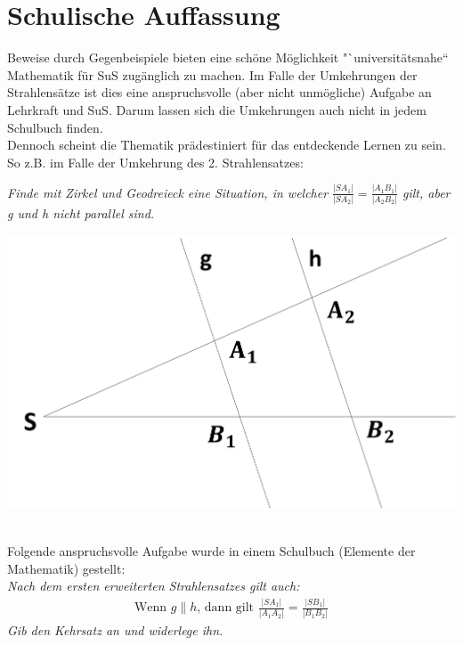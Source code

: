 \documentclass[a4paper,headlines=4, footlines=1]{scrartcl}
\begin{document}
\section{Schulische Auffassung}
Beweise durch Gegenbeispiele bieten eine schöne Möglichkeit "`universitätsnahe`` Mathematik für SuS zugänglich zu machen. Im Falle der Umkehrungen der Strahlensätze ist dies eine anspruchsvolle (aber nicht unmögliche) Aufgabe an Lehrkraft und SuS. Darum lassen sich die Umkehrungen auch nicht in jedem Schulbuch finden. \\
Dennoch scheint die Thematik prädestiniert für das entdeckende Lernen zu sein. So z.B. im Falle der Umkehrung des 2. Strahlensatzes:\\
\begin{minipage}{0.5\textwidth}
	\textit{Finde mit Zirkel und Geodreieck eine Situation, in welcher $\frac{|SA_1|}{|SA_2|}=\frac{|A_1B_1|}{|A_2B_2|}$ gilt, aber g und h nicht parallel sind.}	
\end{minipage}
\begin{minipage}{0.5\textwidth}
	\begin{flushright}
		\includegraphics[scale=0.15]{Skizze}
	\end{flushright}
\end{minipage}\\
Folgende anspruchsvolle Aufgabe wurde in einem Schulbuch (Elemente der Mathematik) gestellt:\\
\textit{Nach dem ersten erweiterten Strahlensatzes gilt auch:}
\begin{align}
\text{Wenn } g\parallel h\text{, dann gilt } \frac{|SA_1|}{|A_1A_2|}=\frac{|SB_1|}{|B_1B_2|} 
\end{align}
\textit{Gib den Kehrsatz an und widerlege ihn.}
\end{document}

